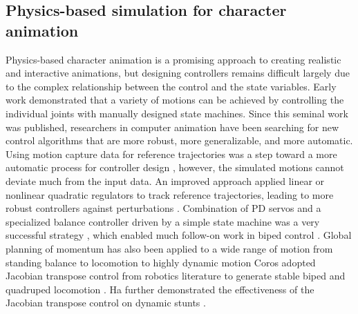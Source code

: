 \subsection{Physics-based simulation for character animation}
Physics-based character animation is a promising approach to creating
realistic and interactive animations, but designing controllers
remains difficult largely due to the complex relationship between the
control and the state variables. 
Early work \cite{Hodgins:1995:AHA,Wooten:1998:Phd} demonstrated that 
a variety of motions can be achieved by controlling the individual joints with
manually designed state machines. Since this seminal work was
published, researchers in computer animation have been searching for
new control algorithms that are more robust, more generalizable, and
more automatic. 
Using motion capture data for reference
trajectories was a step toward a more automatic process for controller
design 
\cite{Zordan:2005:DRM,Sok:2007:SBB}, 
however, the simulated motions
cannot deviate much from the input data. An improved approach applied
linear or nonlinear quadratic regulators to track reference
trajectories, leading to more robust controllers against perturbations
\cite{daSilva:2008:ISS,Muico:2009:CNC}. Combination of PD servos and a
specialized balance controller driven by a simple state machine was a
very successful strategy \cite{Yin:2007:SIM}, which enabled much
follow-on work in biped control 
\cite{Wang:2009:OWC,Coros:2010:GBW,Lee:2010:DDB,Jain:2011:CPC}. 
Global planning of momentum
has also been applied to a wide range of motion from standing balance
\cite{Macchietto:2009:MCB} to locomotion 
\cite{Mordatch:2010:RPL,Ye:2010:OFC}
to highly dynamic motion 
\cite{Ha:2012:FAL,Liu:2012:TRC,AlBorno:2013:TOF,Zordan:2014:CRD}
Coros \etal adopted Jacobian transpose control from robotics literature
\cite{Sunada:1994:ACJ} to generate stable biped and quadruped
locomotion \cite{Coros:2010:GBW,Coros:2011:LSS}. Ha \etal further
demonstrated the effectiveness of the Jacobian transpose control on
dynamic stunts 
\cite{Liu:2010:SCM,Ha:2012:FAL,Ha:2014:ITD}.

